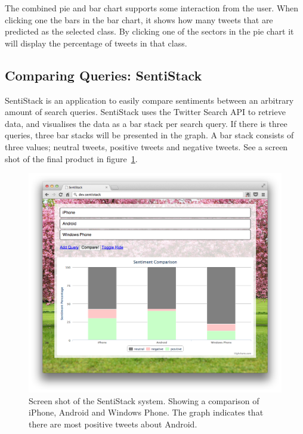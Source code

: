 The combined pie and bar chart supports some interaction from the user. When clicking one the bars in the bar chart, it shows how many tweets that are predicted as the selected class. By clicking one of the sectors in the pie chart it will display the percentage of tweets in that class.

\subsection{Comparing Queries: SentiStack}

SentiStack is an application to easily compare sentiments between an arbitrary amount of search queries. SentiStack uses the Twitter Search API to retrieve data, and visualises the data as a bar stack per search query. If there is three queries, three bar stacks will be presented in the graph. A bar stack consists of three values; neutral tweets, positive tweets and negative tweets. See a screen shot of the final product in figure~\ref{fig:sentistack_screenshot}.


\begin{figure}[htb!]
\begin{center}
 \includegraphics[width=\textwidth]{../img/sentistack_screenshot_full.png}
 \caption[SentiStack screen shot]{Screen shot of the SentiStack system. Showing a comparison of iPhone, Android and Windows Phone. The graph indicates that there are most positive tweets about Android.}
 \label{fig:sentistack_screenshot}
\end{center}
\end{figure}


